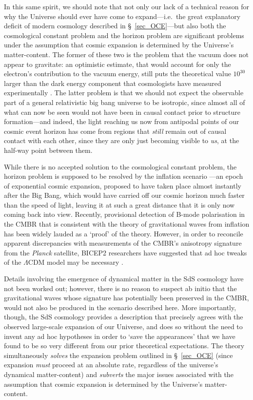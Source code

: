 \documentclass[11pt]{article}
\begin{document}
\begin{appendix}
In this same spirit, we should note that not only our lack of a technical reason for why the Universe should ever have come to expand---i.e.\ the great explanatory deficit of modern cosmology described in \S~\ref{sec_OCE}---but also both the cosmological constant problem \cite{Weinberg1989} and the horizon problem \cite{Guth1981} are significant problems under the assumption that cosmic expansion is determined by the Universe's matter-content. The former of these two is the problem that the vacuum does not appear to gravitate: an optimistic estimate, that would account for only the electron's contribution to the vacuum energy, still puts the theoretical value $10^{30}$ larger than the dark energy component that cosmologists have measured experimentally \cite{Burgess2013}. The latter problem is that we should not expect the observable part of a general relativistic big bang universe to be isotropic, since almost all of what can now be seen would not have been in causal contact prior to structure formation---and indeed, the light reaching us now from antipodal points of our cosmic event horizon has come from regions that \textit{still} remain out of causal contact with each other, since they are only just becoming visible to \textit{us}, at the half-way point between them.

While there is no accepted solution to the cosmological constant problem, the horizon problem is supposed to be resolved by the inflation scenario \cite{Guth1981}---an epoch of exponential cosmic expansion, proposed to have taken place almost instantly after the Big Bang, which would have carried off our cosmic horizon much faster than the speed of light, leaving it at such a great distance that it is only now coming back into view. Recently, provisional detection of B-mode polarisation in the CMBR \cite{Ade2014} that is consistent with the theory of gravitational waves from inflation \cite{IGW} has been widely lauded as a `proof' of the theory. However, in order to reconcile apparent discrepancies with measurements of the CMBR's anisotropy signature from the \textit{Planck} satellite, BICEP2 researchers have suggested that ad hoc tweaks of the $\Lambda$CDM model may be necessary \cite{Commissariat2014}. 

Details involving the emergence of dynamical matter in the SdS cosmology have not been worked out; however, there is no reason to suspect ab initio that the gravitational waves whose signature has potentially been preserved in the CMBR, would not also be produced in the scenario described here. More importantly, though, the SdS cosmology provides a description that precisely agrees with the observed large-scale expansion of our Universe, and does so without the need to invent any ad hoc hypotheses in order to `save the appearances' that we have found to be so very different from our prior theoretical expectations. The theory simultaneously \textit{solves} the expansion problem outlined in \S~\ref{sec_OCE} (since expansion \textit{must} proceed at an absolute rate, regardless of the universe's dynamical matter-content) and \textit{subverts} the major issues associated with the assumption that cosmic expansion is determined by the Universe's matter-content.


\end{appendix}
\end{document}
